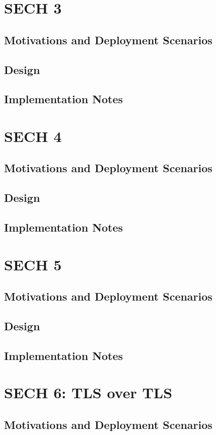 \section{SECH 3}
\subsection{Motivations and Deployment Scenarios}
\subsection{Design}
\subsection{Implementation Notes}
\section{SECH 4}
\subsection{Motivations and Deployment Scenarios}
\subsection{Design}
\subsection{Implementation Notes}
\section{SECH 5}
\subsection{Motivations and Deployment Scenarios}
\subsection{Design}
\subsection{Implementation Notes}
\section{SECH 6: TLS over TLS}
\subsection{Motivations and Deployment Scenarios}
